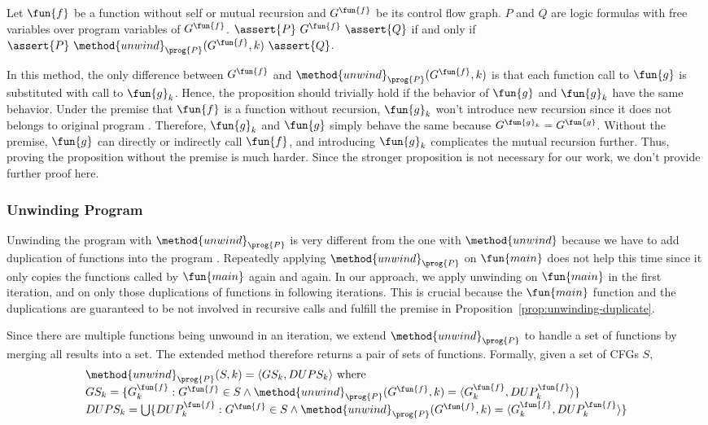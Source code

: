 \begin{proposition}\label{prop:unwinding-duplicate}
  Let $\fun{f}$ be a function without self or mutual recursion and 
  $G^\fun{f}$ be its control flow graph.
  $P$ and $Q$ are logic formulas with free variables over program variables of
  $G^\fun{f}$.
  $\assert{P}\ G^\fun{f}\ \assert{Q}$ if and only if 
  $\assert{P}\ \method{unwind}_\prog{P}(G^\fun{f}, k)\ \assert{Q}$.
\end{proposition}
In this method, the only difference between $G^\fun{f}$ and
$\method{unwind}_\prog{P}(G^\fun{f}, k)$ is that each function call to
$\fun{g}$ is substituted with call to $\fun{g}_k$.
Hence, the proposition should trivially hold if the behavior of $\fun{g}$ and
$\fun{g}_k$ have the same behavior.
Under the premise that $\fun{f}$ is a function without recursion,
$\fun{g}_k$ won't introduce new recursion since it does not belongs to original
program .
Therefore, $\fun{g}_k$ and $\fun{g}$ simply behave the same because 
$G^{\fun{g}_k} = G^\fun{g}$.
Without the premise, $\fun{g}$ can directly or indirectly call $\fun{f}$,
and introducing $\fun{g}_k$ complicates the mutual recursion further.
Thus, proving the proposition without the premise is much harder.
Since the stronger proposition is not necessary for our work,
we don't provide further proof here.

\subsubsection*{Unwinding Program}
Unwinding the program with $\method{unwind}_\prog{P}$ is very different from
the one with $\method{unwind}$ because we have to add duplication of functions
into the program .
Repeatedly applying $\method{unwind}_\prog{P}$ on $\fun{main}$ does not help
this time since it only copies the functions called by $\fun{main}$ again
and again.
In our approach, we apply unwinding on $\fun{main}$ in the first iteration,
and on only those duplications of functions in following iterations.
This is crucial because the $\fun{main}$ function and the duplications are
guaranteed to be not involved in recursive calls and fulfill the premise in
Proposition~\ref{prop:unwinding-duplicate}.

Since there are multiple functions being unwound in an iteration,
we extend $\method{unwind}_\prog{P}$ to handle a set of functions by merging
all results into a set.
The extended method therefore returns a pair of sets of functions.
Formally, given a set of CFGs $S$,
\[
\begin{array}{l}
\method{unwind}_\prog{P}(S, k) = \langle GS_k, DUPS_k \rangle \text{ where}\\
GS_k = \{G^\fun{f}_k : G^\fun{f} \in S
  \land \method{unwind}_\prog{P}(G^\fun{f}, k) 
        = \langle G^\fun{f}_k, DUP^\fun{f}_k \rangle
  \} \\
  
DUPS_k = \bigcup\{
  DUP^\fun{f}_k : G^\fun{f} \in S
  \land \method{unwind}_\prog{P}(G^\fun{f}, k) 
        = \langle G^\fun{f}_k, DUP^\fun{f}_k \rangle
  \} \\
\end{array}
\]

